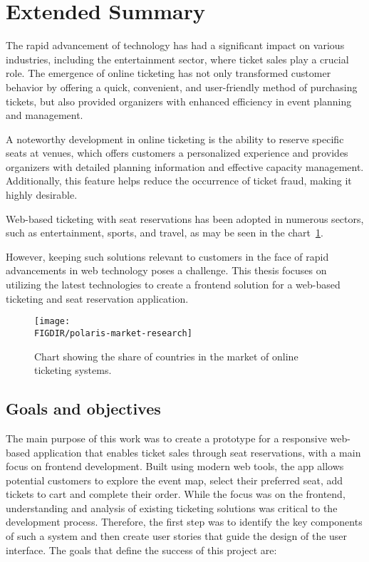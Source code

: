 \chapter*{Extended Summary}
\label{ch:extended-summary}
The rapid advancement of technology has had a significant impact on various industries, including the entertainment sector, where ticket sales play a crucial role.
The emergence of online ticketing has not only transformed customer behavior by offering a quick, convenient, and user-friendly method of purchasing tickets, but also provided organizers with enhanced efficiency in event planning and management.

A noteworthy development in online ticketing is the ability to reserve specific seats at venues, which offers customers a personalized experience and provides organizers with detailed planning information and effective capacity management.
Additionally, this feature helps reduce the occurrence of ticket fraud, making it highly desirable.

Web-based ticketing with seat reservations has been adopted in numerous sectors, such as entertainment, sports, and travel, as may be seen in the chart~\ref{fig:polaris-market-research}.

However, keeping such solutions relevant to customers in the face of rapid advancements in web technology poses a challenge.
This thesis focuses on utilizing the latest technologies to create a frontend solution for a web-based ticketing and seat reservation application.

\begin{figure}[H]
    \centering
    \caption{Chart showing the share of countries in the market of online ticketing systems.}
    \texttt{[image: \\FIGDIR/polaris-market-research]}
    \label{fig:polaris-market-research}
\end{figure}
\pagebreak

\section*{Goals and objectives}
\label{sec:goals-and-objectives}
The main purpose of this work was to create a prototype for a responsive web-based application that enables ticket sales through seat reservations, with a main focus on frontend development.
Built using modern web tools, the app allows potential customers to explore the event map, select their preferred seat, add tickets to cart and complete their order.
While the focus was on the frontend, understanding and analysis of existing ticketing solutions was critical to the development process.
Therefore, the first step was to identify the key components of such a system and then create user stories that guide the design of the user interface.
The goals that define the success of this project are:

